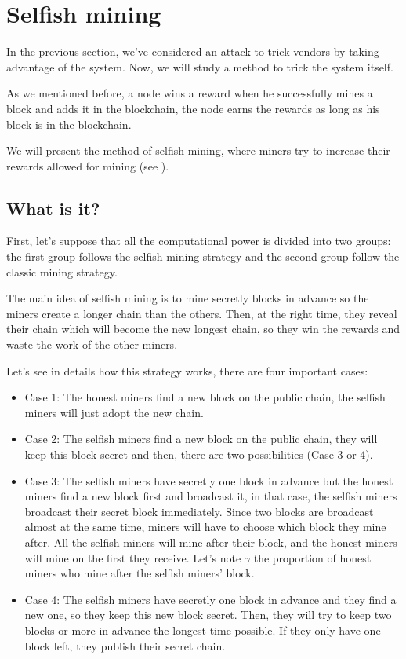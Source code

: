 \section{Selfish mining}

In the previous section, we've considered an attack to trick vendors by taking advantage of the system. Now, we will study a method to trick the system itself.

As we mentioned before, a node wins a reward when he successfully mines a block and adds it in the blockchain, the node earns the rewards as long as his block is in the blockchain. \newline

We will present the method of selfish mining, where miners try to increase their rewards allowed for mining (see \cite{majority_not_enough}).

  \subsection{What is it?}

First, let's suppose that all the computational power is divided into two groups: the first group follows the selfish mining strategy and the second group follow the classic mining strategy. \newline

The main idea of selfish mining is to mine secretly blocks in advance so the miners create a longer chain than the others. Then, at the right time, they reveal their chain which will become the new longest chain, so they win the rewards and waste the work of the other miners. \newline

Let's see in details how this strategy works, there are four important cases: \newline

\begin{itemize}
  \item Case 1: The honest miners find a new block on the public chain, the selfish miners will just adopt the new chain.
  \item Case 2: The selfish miners find a new block on the public chain, they will keep this block secret and then, there are two possibilities (Case 3 or 4).
  \item Case 3: The selfish miners have secretly one block in advance but the honest miners find a new block first and broadcast it, in that case, the selfish miners broadcast their secret block immediately. Since two blocks are broadcast almost at the same time, miners will have to choose which block they mine after. All the selfish miners will mine after their block, and the honest miners will mine on the first they receive. Let's note $\gamma$ the proportion of honest miners who mine after the selfish miners' block.
  \item Case 4: The selfish miners have secretly one block in advance and they find a new one, so they keep this new block secret. Then, they will try to keep two blocks or more in advance the longest time possible. If they only have one block left, they publish their secret chain.
\end{itemize}
\medskip


